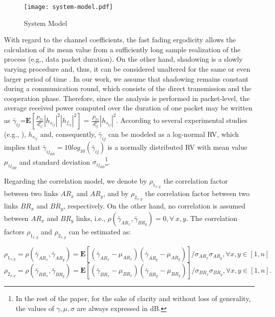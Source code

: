 \documentclass[12pt,draftcls, onecolumn]{IEEEtran}
\begin{document}
\begin{figure}[htb]
\centering
\texttt{[image: system-model.pdf]}
\caption{System Model}\label{f1}
\end{figure}

With regard to the channel coefficients, the fast fading ergodicity allows the calculation of its mean value from a sufficiently long sample realization of the process (e.g., data packet duration). On the other hand, shadowing is a slowly varying procedure and, thus, it can be considered unaltered for the same or even larger period of time \cite{thesismary}. In our work, we assume that shadowing remains constant during a communication round, which consists of the direct transmission and the cooperation phase. Therefore, since the analysis is performed in packet-level, the average received power computed over the duration of one packet may be written as $\bar{\gamma}_{ij}$=$\mathbf{E}\left[\frac{P_{Tx}}{d_{ij}^a}\left|h_{s_{ij}}\right|^2\left|h_{f_{ij}}\right|^2\right]$ = $\frac{P_{Tx}}{d_{ij}^a}\left|h_{s_{ij}}\right|^2$. According to several experimental studies (e.g., \cite{5288484}), $h_{s_{ij}}$ and, consequently, $\bar{\gamma}_{ij}$ can be modeled as a log-normal RV, which implies that $\bar{\gamma}_{ij_{dB}} = 10 log_{10}\left(\bar{\gamma}_{ij}\right)$ is a normally distributed RV with mean value $\mu_{ij_{dB}}$ and standard deviation $\sigma_{ij_{dB}}$\footnote{In the rest of the paper, for the sake of clarity and without loss of generality, the values of $\gamma, \mu, \sigma$ are always expressed in dB.}.

Regarding the correlation model, we denote by $\rho_{1_{x,y}}$ the correlation factor between two links $AR_{x}$ and $AR_{y}$, and by $\rho_{2_{x,y}}$ the correlation factor between two links $BR_{x}$ and $BR_{y}$, respectively. On the other hand, no correlation is assumed between $AR_{x}$ and $BR_{y}$ links, i.e., $\rho(\bar{\gamma}_{AR_{x}},\bar{\gamma}_{BR_{y}}) = 0, \forall\ x,y$. The correlation factors $\rho_{1_{x,y}}$ and $\rho_{2_{x,y}}$ can be estimated as:

\begin{equation}
\rho_{1_{x,y}}=\rho\left(\bar{\gamma}_{AR_{x}},\bar{\gamma}_{AR_{y}}\right)=\mathbf{E}\left[\left(\bar{\gamma}_{AR_{x}} - \mu_{AR_{x}}\right)\left(\bar{\gamma}_{AR_{y}} - \mu_{AR_{y}}\right)\right]/\sigma_{AR_{x}}\sigma_{AR_{y}}, \forall x,y\in [1,n]
\end{equation}
\begin{equation}
\rho_{2_{x,y}}=\rho\left(\bar{\gamma}_{BR_{x}},\bar{\gamma}_{BR_{y}}\right)=\mathbf{E}\left[\left(\bar{\gamma}_{BR_{x}} - \mu_{BR_{x}}\right)\left(\bar{\gamma}_{BR_{y}} - \mu_{BR_{y}}\right)\right]/\sigma_{BR_{x}}\sigma_{BR_{y}}, \forall x,y\in [1,n].
\end{equation}
\end{document}
